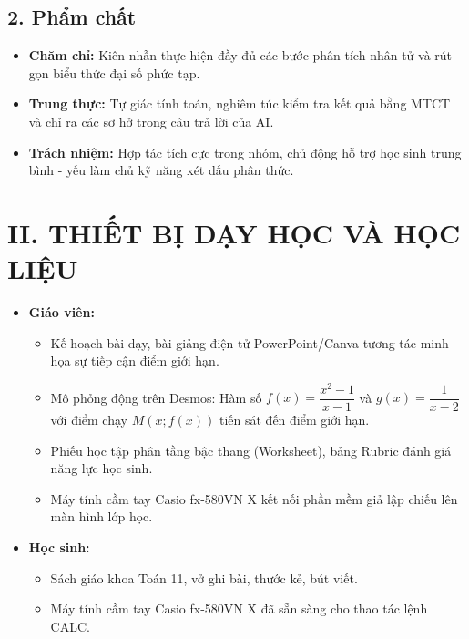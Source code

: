 \documentclass[12pt, a4paper]{article}
\begin{document}
\subsection*{2. Phẩm chất}

\begin{itemize}[leftmargin=1.2cm]
    \item \textbf{Chăm chỉ:} Kiên nhẫn thực hiện đầy đủ các bước phân tích nhân tử và rút gọn biểu thức đại số phức tạp.
    \item \textbf{Trung thực:} Tự giác tính toán, nghiêm túc kiểm tra kết quả bằng MTCT và chỉ ra các sơ hở trong câu trả lời của AI.
    \item \textbf{Trách nhiệm:} Hợp tác tích cực trong nhóm, chủ động hỗ trợ học sinh trung bình - yếu làm chủ kỹ năng xét dấu phân thức.
\end{itemize}

\section*{II. THIẾT BỊ DẠY HỌC VÀ HỌC LIỆU}

\begin{itemize}[leftmargin=1.2cm]
    \item \textbf{Giáo viên:}
    \begin{itemize}[leftmargin=0.6cm]
        \item Kế hoạch bài dạy, bài giảng điện tử PowerPoint/Canva tương tác minh họa sự tiếp cận điểm giới hạn.
        \item Mô phỏng động trên Desmos: Hàm số $f(x) = \dfrac{x^2 - 1}{x - 1}$ và $g(x) = \dfrac{1}{x - 2}$ với điểm chạy $M(x; f(x))$ tiến sát đến điểm giới hạn.
        \item Phiếu học tập phân tầng bậc thang (Worksheet), bảng Rubric đánh giá năng lực học sinh.
        \item Máy tính cầm tay Casio fx-580VN X kết nối phần mềm giả lập chiếu lên màn hình lớp học.
    \end{itemize}
    \item \textbf{Học sinh:}
    \begin{itemize}[leftmargin=0.6cm]
        \item Sách giáo khoa Toán 11, vở ghi bài, thước kẻ, bút viết.
        \item Máy tính cầm tay Casio fx-580VN X đã sẵn sàng cho thao tác lệnh CALC.
    \end{itemize}
\end{itemize}
\end{document}
